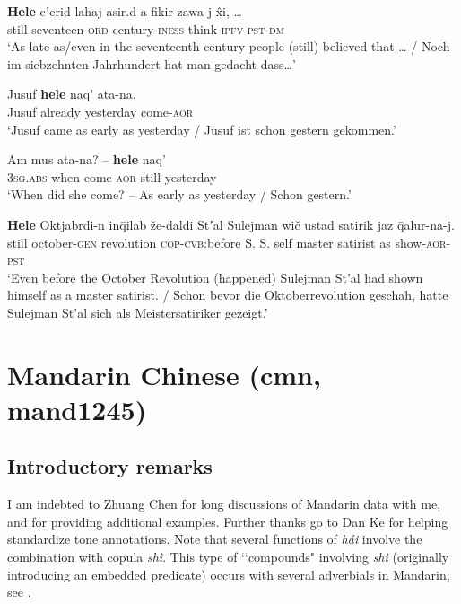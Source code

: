 \begin{exe}
	\ex\label{exAppendixLezgianTimeScalar1}
	\gll \textbf{Hele} cʼerid lahaj asir.d-a fikir-zawa-j x̂i, …\\
	still seventeen \textsc{ord} century-\textsc{iness} think-\textsc{ipfv}-\textsc{pst} \textsc{dm}\\
	\glt \lq As late as/even in the seventeenth century people (still) believed that … / Noch im siebzehnten Jahrhundert hat man gedacht dass…' \parencite[90]{Haspelmath1991}
	
	\ex\label{exAppendixLezgianTimeScalar2}
\gll Jusuf \textbf{hele} naq' ata-na.\\
Jusuf already yesterday come-\textsc{aor}\\
\glt \lq Jusuf came as early as yesterday / Jusuf ist schon gestern gekommen.' \parencite[85]{Haspelmath1991}

	\ex\label{exAppendixLezgianTimeScalar3}
\gll Am mus ata-na? – \textbf{hele} naq'\\
3\textsc{sg}.\textsc{abs} when come-\textsc{aor} {} still yesterday\\
\glt \lq When did she come? -- As early as yesterday / Schon gestern.' \parencite[85]{Haspelmath1991}

	\ex\label{exAppendixLezgianTimeScalar4}
\gll \textbf{Hele} Oktjabrdi-n inq̄ilab že-daldi Stʼal Sulejman wič ustad satirik jaz q̄alur-na-j.\\
still october-\textsc{gen} revolution \textsc{cop}-\textsc{cvb}:before S. S. self master satirist as show-\textsc{aor}-\textsc{pst}\\
\glt \lq Even before the October Revolution (happened) Sulejman St'al had shown himself as a master satirist. / Schon bevor die Oktoberrevolution geschah, hatte Sulejman St'al sich als Meistersatiriker gezeigt.' \parencite[86]{Haspelmath1991}
\end{exe}

\section{Mandarin Chinese (cmn, mand1245)}
\label{appendixMandarin}

\subsection{Introductory remarks}
I am indebted to Zhuang Chen for long discussions of Mandarin data with me, and for providing additional examples. Further thanks go to Dan Ke for helping standardize tone annotations. Note that several functions of \textit{hái} involve the combination with copula \textit{shì}. This type of \lq\lq compounds" involving \textit{shì} (originally introducing an embedded predicate) occurs with several adverbials in Mandarin; see \textcite[311–312]{Wiedenhof2015}.


